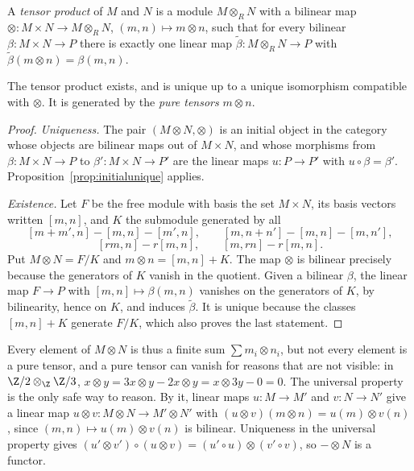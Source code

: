 \begin{definition}\label{def:tensor}
A \emph{tensor product} of $M$ and $N$ is a module $M\otimes_RN$ with a bilinear map $\otimes\colon M\times N\to M\otimes_RN$, $(m,n)\mapsto m\otimes n$, such that for every bilinear $\beta\colon M\times N\to P$ there is exactly one
linear map $\tilde\beta\colon M\otimes_RN\to P$ with $\tilde\beta(m\otimes n)=\beta(m,n)$.
\end{definition}

\begin{theorem}\label{thm:tensorexists}
The tensor product exists, and is unique up to a unique isomorphism compatible with $\otimes$. It is generated by the \emph{pure tensors} $m\otimes n$.
\end{theorem}

\begin{proof}
\emph{Uniqueness.} The pair $(M\otimes N,\otimes)$ is an initial object in the category whose objects are bilinear maps out of $M\times N$, and whose morphisms from $\beta\colon M\times N\to P$ to $\beta'\colon M\times N\to P'$ are the linear
maps $u\colon P\to P'$ with $u\circ\beta=\beta'$. Proposition~\ref{prop:initialunique} applies.

\emph{Existence.} Let $F$ be the free module with basis the set $M\times N$, its basis vectors written $[m,n]$, and $K$ the submodule generated by all
\[[m+m',n]-[m,n]-[m',n],\qquad[m,n+n']-[m,n]-[m,n'],\]
\[[rm,n]-r[m,n],\qquad[m,rn]-r[m,n].\]
Put $M\otimes N=F/K$ and $m\otimes n=[m,n]+K$. The map $\otimes$ is bilinear precisely because the generators of $K$ vanish in the quotient. Given a bilinear $\beta$, the linear map $F\to P$ with $[m,n]\mapsto\beta(m,n)$
vanishes on the generators of $K$, by bilinearity, hence on $K$, and induces $\tilde\beta$. It is unique because the classes $[m,n]+K$ generate $F/K$, which also proves the last statement.
\end{proof}

Every element of $M\otimes N$ is thus a finite sum $\sum m_i\otimes n_i$, but not every element is a pure tensor, and a pure tensor can vanish for reasons that are not visible: in $\Z/2\otimes_{\Z}\Z/3$,
$x\otimes y=3x\otimes y-2x\otimes y=x\otimes3y-0=0$. The universal property is the only safe way to reason. By it, linear maps $u\colon M\to M'$ and $v\colon N\to N'$ give a linear map $u\otimes v\colon M\otimes N\to M'\otimes N'$ with
$(u\otimes v)(m\otimes n)=u(m)\otimes v(n)$, since $(m,n)\mapsto u(m)\otimes v(n)$ is bilinear. Uniqueness in the universal property gives $(u'\otimes v')\circ(u\otimes v)=(u'\circ u)\otimes(v'\circ v)$, so $-\otimes N$ is a functor.

